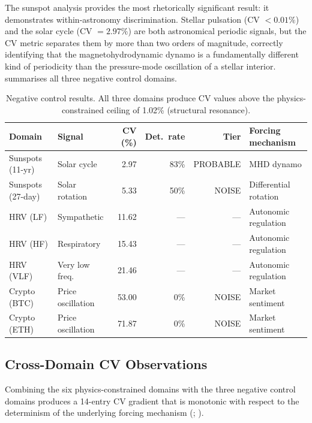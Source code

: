 \documentclass[11pt,a4paper]{article}
\begin{document}
The sunspot analysis provides the most rhetorically significant result: it demonstrates within-astronomy discrimination. Stellar pulsation (CV $< 0.01\%$) and the solar cycle (CV $= 2.97\%$) are both astronomical periodic signals, but the CV metric separates them by more than two orders of magnitude, correctly identifying that the magnetohydrodynamic dynamo is a fundamentally different kind of periodicity than the pressure-mode oscillation of a stellar interior.  summarises all three negative control domains.

\begin{table}[htbp]
\centering
\caption{Negative control results. All three domains produce CV values above the physics-constrained ceiling of 1.02\% (structural resonance).}
\label{tab:negcontrols}
\smallskip
\small
\begin{tabular}{llrrrl}
\toprule
\textbf{Domain} & \textbf{Signal} & \textbf{CV (\%)} & \textbf{Det.\ rate} & \textbf{Tier} & \textbf{Forcing mechanism} \\
\midrule
Sunspots (11-yr)  & Solar cycle       &  2.97  & 83\%  & PROBABLE & MHD dynamo \\
Sunspots (27-day) & Solar rotation    &  5.33  & 50\%  & NOISE    & Differential rotation \\
HRV (LF)          & Sympathetic       & 11.62  & ---   & ---      & Autonomic regulation \\
HRV (HF)          & Respiratory       & 15.43  & ---   & ---      & Autonomic regulation \\
HRV (VLF)         & Very low freq.    & 21.46  & ---   & ---      & Autonomic regulation \\
Crypto (BTC)      & Price oscillation & 53.00  & 0\%   & NOISE    & Market sentiment \\
Crypto (ETH)      & Price oscillation & 71.87  & 0\%   & NOISE    & Market sentiment \\
\bottomrule
\end{tabular}
\end{table}

\subsection{Cross-Domain CV Observations}
\label{sec:cv-observations}

Combining the six physics-constrained domains with the three negative control domains produces a 14-entry CV gradient that is monotonic with respect to the determinism of the underlying forcing mechanism (; ).
\end{document}
